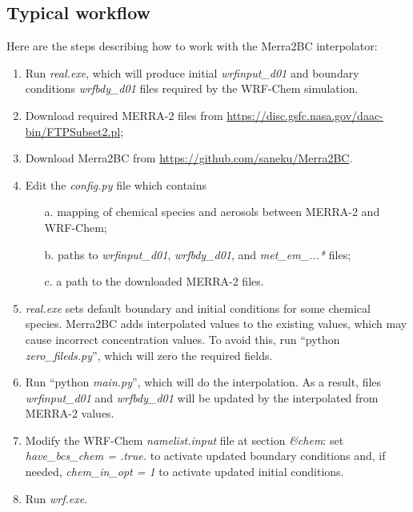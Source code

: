 \documentclass{article}
\begin{document}
\subsection{Typical workflow}

Here are the steps describing how to work with the {Merra2BC} interpolator:
\begin{enumerate}
\item Run \textit{real.exe}, which will produce initial \textit{wrfinput\_d01} and boundary conditions \textit{wrfbdy\_d01} files required by the WRF-Chem simulation.
\item Download required MERRA-2 files from \url{https://disc.gsfc.nasa.gov/daac-bin/FTPSubset2.pl};
\item Download {Merra2BC} from \url{https://github.com/saneku/Merra2BC}.
\item Edit the \textit{config.py} file which contains
\begin{itemize}
\item[a.] mapping of chemical species and aerosols between MERRA-2 and WRF-Chem;
\item[b.] paths to \textit{wrfinput\_d01}, \textit{wrfbdy\_d01}, and \textit{met\_em\_...*} files;
\item[c.] a path to the downloaded MERRA-2 files.
\end{itemize}
\item \textit{real.exe} sets default boundary and initial conditions for some chemical species.  {Merra2BC} adds interpolated values to the existing values, which may cause incorrect concentration values. To avoid this, run ``python \textit{zero\_fileds.py}'', which will zero the required fields.
\item Run ``python \textit{main.py}'', which will do the interpolation. As a result, files \textit{wrfinput\_d01} and \textit{wrfbdy\_d01} will be updated by the interpolated from MERRA-2 values.
\item Modify the WRF-Chem \textit{namelist.input} file at section \textit{\&chem}: set \textit{have\_bcs\_chem = .true.} to activate updated boundary conditions and, if needed, \textit{chem\_in\_opt = 1} to activate updated initial conditions.
\item Run \textit{wrf.exe}.
\end{enumerate}

\hack{\newpage}



\end{document}
